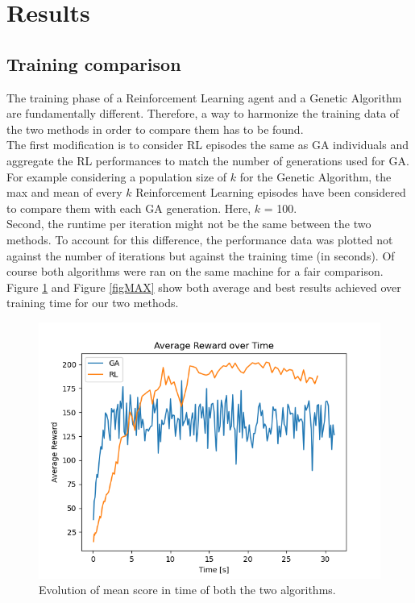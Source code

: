 \section{Results}

\subsection{Training comparison}

The training phase of a Reinforcement Learning agent and a Genetic Algorithm are fundamentally different.
Therefore, a way to harmonize the training data of the two methods in order to compare them has to be found.
\\
The first modification is to consider RL episodes the same as GA individuals and aggregate the RL performances to match the number of generations used for GA.
For example considering a population size of $k$ for the Genetic Algorithm, the max and mean of every $k$ Reinforcement Learning episodes have been considered to compare them with each GA generation. Here, $k$ = 100.
\\
Second, the runtime per iteration might not be the same between the two methods. To account for this difference, the performance data was plotted not against the number of iterations but against the training time (in seconds).
Of course both algorithms were ran on the same machine for a fair comparison.
\\
Figure \ref{figAVG} and Figure \ref{figMAX} show both average and best results achieved over training time for our two methods.

\begin{figure}[H]
	\centering
	\includegraphics [scale = 0.5]{Images/RL_GA_comparison_avg.png}
	\caption{Evolution of mean score in time of both the two algorithms.}
	\label{figAVG}
\end{figure}

